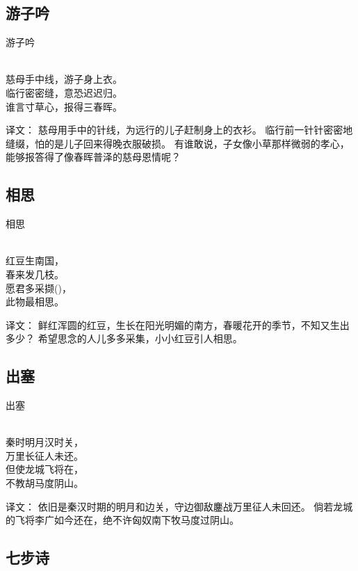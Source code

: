 \subsection{游子吟}

\noindent 游子吟

  \\

\noindent 慈母手中线，游子身上衣。\\
临行密密缝，意恐迟迟归。\\
谁言寸草心，报得三春晖。

译文：
慈母用手中的针线，为远行的儿子赶制身上的衣衫。
临行前一针针密密地缝缀，怕的是儿子回来得晚衣服破损。
有谁敢说，子女像小草那样微弱的孝心，能够报答得了像春晖普泽的慈母恩情呢？

\subsection{相思}

\noindent 相思

  \\

\noindent 红豆生南国，\\春来发几枝。\\
愿君多采撷()，\\此物最相思。

译文：
鲜红浑圆的红豆，生长在阳光明媚的南方，春暖花开的季节，不知又生出多少？
希望思念的人儿多多采集，小小红豆引人相思。

\subsection{出塞}

\noindent 出塞

  \\

\noindent 秦时明月汉时关，\\万里长征人未还。\\
但使龙城飞将在，\\不教胡马度阴山。

译文：
依旧是秦汉时期的明月和边关，守边御敌鏖战万里征人未回还。
倘若龙城的飞将李广如今还在，绝不许匈奴南下牧马度过阴山。

\subsection{七步诗}

